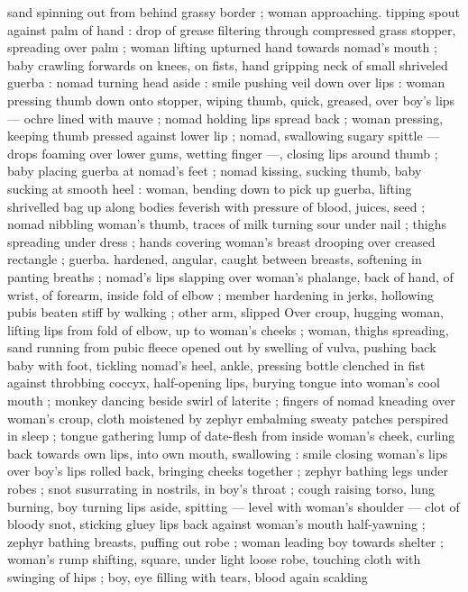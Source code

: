 sand spinning out from behind grassy border ; woman approaching. 
tipping spout against palm of hand : drop of grease filtering through 
compressed grass stopper, spreading over palm ; woman lifting 
upturned hand towards nomad's mouth ; baby crawling forwards on 
knees, on fists, hand gripping neck of small shriveled guerba : 
nomad turning head aside : smile pushing veil down over lips : 
woman pressing thumb down onto stopper, wiping thumb, quick, 
greased, over boy's lips --- ochre lined with mauve ; nomad holding 
lips spread back ; woman pressing, keeping thumb pressed against 
lower lip ; nomad, swallowing sugary spittle --- drops foaming over 
lower gums, wetting finger ---, closing lips around thumb ; baby 
placing guerba at nomad's feet ; nomad kissing, sucking thumb, baby 
sucking at smooth heel : woman, bending down to pick up guerba, 
lifting shrivelled bag up along bodies feverish with pressure of 
blood, juices, seed ; nomad nibbling woman's thumb, traces of milk 
turning sour under nail ; thighs spreading under dress ; hands 
covering woman's breast drooping over creased rectangle ; guerba. 
hardened, angular, caught between breasts, softening in panting 
breaths ; nomad's lips slapping over woman's phalange, back of 
hand, of wrist, of forearm, inside fold of elbow ; member hardening 
in jerks, hollowing pubis beaten stiff by walking ; other arm, slipped 
Over croup, hugging woman, lifting lips from fold of elbow, up to 
woman's cheeks ; woman, thighs spreading, sand running from pubic 
fleece opened out by swelling of vulva, pushing back baby with foot, 
tickling nomad's heel, ankle, pressing bottle clenched in fist against 
throbbing coccyx, half-opening lips, burying tongue into woman's 
cool mouth ; monkey dancing beside swirl of laterite ; fingers of 
nomad kneading over woman's croup, cloth moistened by zephyr 
embalming sweaty patches perspired in sleep ; tongue gathering 
lump of date-flesh from inside woman's cheek, curling back towards 
own lips, into own mouth, swallowing : smile closing woman's lips 
over boy's lips rolled back, bringing cheeks together ; zephyr bathing 
legs under robes ; snot susurrating in nostrils, in boy's throat ; cough 
raising torso, lung burning, boy turning lips aside, spitting --- level 
with woman's shoulder --- clot of bloody snot, sticking gluey lips 
back against woman's mouth half-yawning ; zephyr bathing breasts, 
puffing out robe ; woman leading boy towards shelter ; woman's 
rump shifting, square, under light loose robe, touching cloth with 
swinging of hips ; boy, eye filling with tears, blood again scalding 
